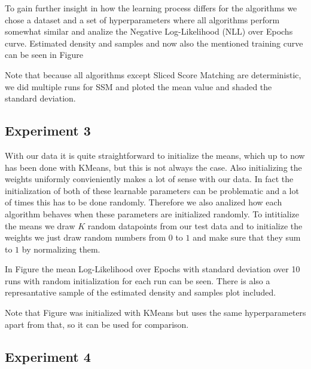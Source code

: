 To gain further insight in how the learning process differs for the algorithms we chose a dataset and a set of hyperparameters
where all algorithms perform somewhat similar and analize the Negative Log-Likelihood (NLL) over Epochs curve. 
Estimated density and samples and now also the mentioned training curve can be seen in Figure 

Note that because all algorithms except Sliced Score Matching are deterministic, we did multiple runs for SSM and ploted the mean value 
and shaded the standard deviation. 


\subsection{Experiment 3}
\label{sec:2d_exp3}

With our data it is quite straightforward to initialize the means, which up to now has been done with KMeans, but this is not always the case.
Also initializing the weights uniformly convieniently makes a lot of sense with our data. In fact the initialization of both of these 
learnable parameters can be problematic and a lot of times this has to be done randomly. Therefore we also analized how each algorithm 
behaves when these parameters are initialized randomly. To intitialize the means we draw $K$ random datapoints from our test data and 
to initialize the weights we just draw random numbers from $0$ to $1$ and make sure that they sum to $1$ by normalizing them.

In Figure the mean Log-Likelihood over Epochs with standard deviation over 10 runs with random initialization for each run can be seen. 
There is also a represantative sample of the estimated density and samples plot included. 

Note that Figure was initialized with KMeans but uses the same hyperparameters apart from that, so it can be used for comparison. 

\subsection{Experiment 4}

